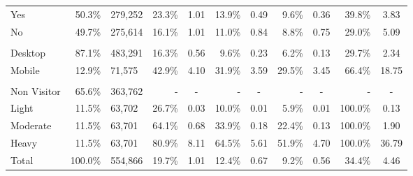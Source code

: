 \begin{tabular}{lrl@{\hskip 15pt}r@{\hskip 3pt}cr@{\hskip 3pt}cr@{\hskip 3pt}cr@{\hskip 3pt}c}
\quad Yes & 50.3\% & 279,252 & 23.3\% & 1.01 & 13.9\% & 0.49 & 9.6\% & 0.36 & 39.8\% & 3.83 \\
\quad No & 49.7\% & 275,614 & 16.1\% & 1.01 & 11.0\% & 0.84 & 8.8\% & 0.75 & 29.0\% & 5.09 \\
\addlinespace
\multicolumn{11}{l}{\textbf{Device Type}} \\
\quad Desktop & 87.1\% & 483,291 & 16.3\% & 0.56 & 9.6\% & 0.23 & 6.2\% & 0.13 & 29.7\% & 2.34 \\
\quad Mobile & 12.9\% & 71,575 & 42.9\% & 4.10 & 31.9\% & 3.59 & 29.5\% & 3.45 & 66.4\% & 18.75 \\
\addlinespace
\multicolumn{11}{l}{\textbf{XXX Usage Tercile$^\dagger$}} \\
\quad Non Visitor & 65.6\% & 363,762 & - & - & - & - & - & - & - & - \\
\quad Light & 11.5\% & 63,702 & 26.7\% & 0.03 & 10.0\% & 0.01 & 5.9\% & 0.01 & 100.0\% & 0.13 \\
\quad Moderate & 11.5\% & 63,701 & 64.1\% & 0.68 & 33.9\% & 0.18 & 22.4\% & 0.13 & 100.0\% & 1.90 \\
\quad Heavy & 11.5\% & 63,701 & 80.9\% & 8.11 & 64.5\% & 5.61 & 51.9\% & 4.70 & 100.0\% & 36.79 \\
\midrule
Total & 100.0\% & 554,866 & 19.7\% & 1.01 & 12.4\% & 0.67 & 9.2\% & 0.56 & 34.4\% & 4.46 \\
\bottomrule
\end{tabular}
